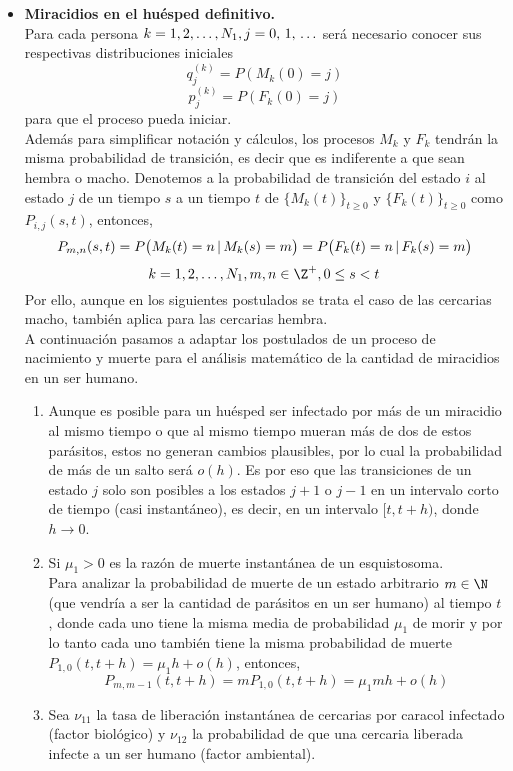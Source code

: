 \begin{itemize}
    \item \textbf{Miracidios en el huésped definitivo.}\\
Para cada persona $k=1,2,\ldots,N_1, j=0,\thinspace 1,\thinspace\ldots$ será necesario conocer sus respectivas distribuciones iniciales $$q_j^{(k)}=P(M_k(0)=j)$$ $$p_j^{(k)}=P(F_k(0)=j)$$ para que el proceso pueda iniciar.\\
    Además para simplificar notación y cálculos, los procesos $M_k$ y $F_k$ tendrán la misma probabilidad de transición, es decir que es indiferente a que sean hembra o macho.
    Denotemos a la probabilidad de transición del estado $i$ al estado $j$ de un tiempo $s$ a un tiempo $t$ de $\{M_k(t)\}_{t\geq 0}$ y $\{F_k(t)\}_{t\geq 0}$ como $P_{i,j}(s,t)$, entonces, 
    $$P_{m,n}(s,t)=P\big(M_k(t)=n\thinspace|\thinspace M_k(s)=m\big)=P\big(F_k(t)=n\thinspace|\thinspace F_k(s)=m\big)$$
    $$k=1,2,\ldots,N_1, m,n\in\Z^+,0\leq s<t$$
    Por ello, aunque en los siguientes postulados se trata el caso de las cercarias macho, también aplica para las cercarias hembra.\\
    A continuación pasamos a adaptar los postulados de un proceso de nacimiento y muerte para el análisis matemático de la cantidad de miracidios en un ser humano.
    \begin{enumerate}
        \item Aunque es posible para un huésped ser infectado por más de un miracidio al mismo tiempo o que al mismo tiempo mueran más de dos de estos parásitos, estos no generan cambios plausibles, por lo cual la probabilidad de más de un salto será $o(h)$. Es por eso que las transiciones de un estado $j$ solo son posibles a los estados $j+1$ o $j-1$ en un intervalo corto de tiempo (casi instantáneo), es decir, en un intervalo $[t,t+h)$, donde $h\rightarrow 0$.
        \item Si $\mu_1>0$ es la razón de muerte instantánea de un esquistosoma.\\
        Para analizar la probabilidad de muerte de un estado arbitrario $m\in \N$ (que vendría a ser la cantidad de parásitos en un ser humano) al tiempo $t$, donde cada uno tiene la misma media de probabilidad $\mu_1$ de morir y por lo tanto cada uno también tiene la misma probabilidad de muerte $P_{1,0}(t, t+h)=\mu_1 h + o(h)$, entonces, 
        $$P_{m ,m-1}(t,t+h)=mP_{1,0}(t,t+h)=\mu_1 mh+o(h)$$
         \item  Sea $\nu_{11}$ la tasa de liberación instantánea de cercarias por caracol infectado (factor biológico) y $\nu_{12}$ la probabilidad de que una cercaria liberada infecte a un ser humano (factor ambiental).\\

\end{enumerate}
\end{itemize}
